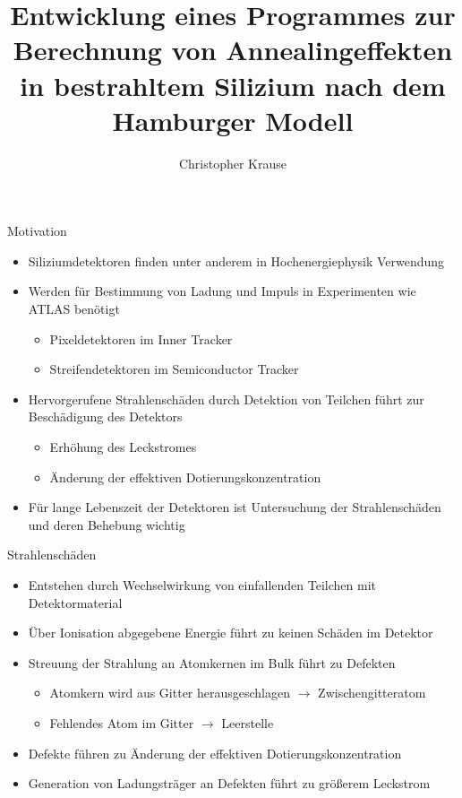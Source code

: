 \documentclass[aspectratio=1610, 9pt]{beamer}
\title{Entwicklung eines Programmes zur Berechnung von Annealingeffekten in bestrahltem Silizium nach dem Hamburger Modell}
\author[C.~Krause]{Christopher Krause}
\institute[E4]{Experimentelle Physik \\ Fakultät Physik}
\begin{document}
\maketitle




\begin{frame}{Motivation}
  \begin{itemize}
    \item Siliziumdetektoren finden unter anderem in Hochenergiephysik Verwendung
    \medskip
    \item Werden für Bestimmung von Ladung und Impuls in Experimenten wie ATLAS benötigt
      \begin{itemize}
        \item Pixeldetektoren im Inner Tracker
        \item Streifendetektoren im Semiconductor Tracker
      \end{itemize}
    \medskip
    \item Hervorgerufene Strahlenschäden durch Detektion von Teilchen führt zur Beschädigung des Detektors
      \begin{itemize}
        \item Erhöhung des Leckstromes
        \item Änderung der effektiven Dotierungskonzentration
      \end{itemize}
    \medskip
    \item Für lange Lebenszeit der Detektoren ist Untersuchung der Strahlenschäden und
          deren Behebung wichtig
  \end{itemize}
\end{frame}



\begin{frame}{Strahlenschäden}
  \begin{itemize}
    \item Entstehen durch Wechselwirkung von einfallenden Teilchen mit Detektormaterial
    \medskip
    \item Über Ionisation abgegebene Energie führt zu keinen Schäden im Detektor
    \medskip
    \item Streuung der Strahlung an Atomkernen im Bulk führt zu Defekten
      \begin{itemize}
        \item Atomkern wird aus Gitter herausgeschlagen $\rightarrow$ Zwischengitteratom
        \item Fehlendes Atom im Gitter $\rightarrow$ Leerstelle
      \end{itemize}
    \medskip
    \item Defekte führen zu Änderung der effektiven Dotierungskonzentration
    \medskip
    \item Generation von Ladungsträger an Defekten führt zu größerem Leckstrom
  \end{itemize}
\end{frame}
\end{document}
